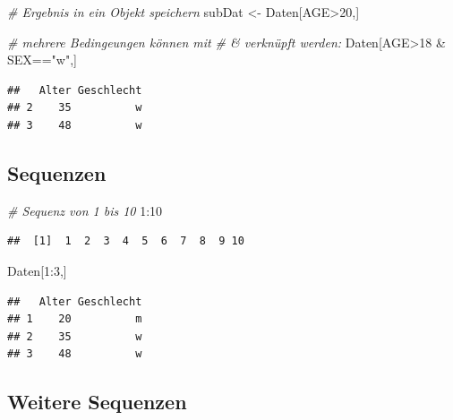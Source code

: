 \documentclass[]{article}
\newenvironment{Shaded}{\begin{snugshade}}{\end{snugshade}}
\newcommand{\DecValTok}[1]{\textcolor[rgb]{0.00,0.00,0.81}{{#1}}}
\newcommand{\StringTok}[1]{\textcolor[rgb]{0.31,0.60,0.02}{{#1}}}
\newcommand{\CommentTok}[1]{\textcolor[rgb]{0.56,0.35,0.01}{\textit{{#1}}}}
\newcommand{\NormalTok}[1]{{#1}}
\begin{document}
\begin{Shaded}
\begin{Highlighting}[]
\CommentTok{# Ergebnis in ein Objekt speichern}
\NormalTok{subDat <-}\StringTok{ }\NormalTok{Daten[AGE>}\DecValTok{20}\NormalTok{,]}
\end{Highlighting}
\end{Shaded}

\begin{Shaded}
\begin{Highlighting}[]
\CommentTok{# mehrere Bedingeungen können mit}
\CommentTok{# & verknüpft werden:}
\NormalTok{Daten[AGE>}\DecValTok{18} \NormalTok{&}\StringTok{ }\NormalTok{SEX==}\StringTok{"w"}\NormalTok{,]}
\end{Highlighting}
\end{Shaded}

\begin{verbatim}
##   Alter Geschlecht
## 2    35          w
## 3    48          w
\end{verbatim}

\subsection{Sequenzen}\label{sequenzen}

\begin{Shaded}
\begin{Highlighting}[]
\CommentTok{# Sequenz von 1 bis 10}
\DecValTok{1}\NormalTok{:}\DecValTok{10}
\end{Highlighting}
\end{Shaded}

\begin{verbatim}
##  [1]  1  2  3  4  5  6  7  8  9 10
\end{verbatim}

\begin{Shaded}
\begin{Highlighting}[]
\NormalTok{Daten[}\DecValTok{1}\NormalTok{:}\DecValTok{3}\NormalTok{,]}
\end{Highlighting}
\end{Shaded}

\begin{verbatim}
##   Alter Geschlecht
## 1    20          m
## 2    35          w
## 3    48          w
\end{verbatim}

\subsection{Weitere Sequenzen}\label{weitere-sequenzen}
\end{document}
